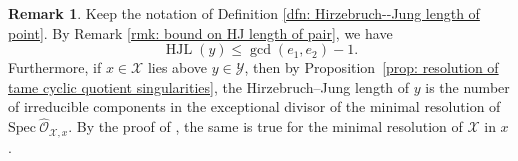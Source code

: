 \documentclass[12pt]{amsart}
\numberwithin{equation}{section}
\theoremstyle{definition}
\newtheorem{remark}[equation]{Remark}
\newtheorem{defn}[equation]{Definition}
\newcommand{\mc}[1]{\mathcal{#1}}
\renewcommand{\O}{\mathcal{O}}
\newcommand{\proj}{\mathbb P}
\newcommand{\Spec}{\mathrm{Spec} \ }
\newcommand{\X}{\mathcal{X}}
\newcommand{\Y}{\mathcal{Y}}
\DeclareMathOperator{\HJL}{HJL}
\begin{document}
\begin{remark}\label{rmk: bound on HJ length of point}
    Keep the notation of Definition \ref{dfn: Hirzebruch--Jung length
      of point}.  By Remark \ref{rmk: bound on HJ length of pair}, we
    have \[\HJL(y)\leq\gcd(e_1,e_2)-1. \]
    Furthermore, if $x
      \in \mc{X}$ lies above $y \in \mc{Y}$, then by
      Proposition~\ref{prop: resolution of tame cyclic quotient
        singularities}, the
    Hirzebruch--Jung length of $y$ is the number of
    irreducible components in the exceptional divisor of the
    minimal resolution of $\Spec \hat{\O}_{\X,x}$. By the proof of \cite[Proposition 3.5]{ObusWewers}, the same is true for the minimal resolution of $\X$ in $x$.
\end{remark}



\end{document}
